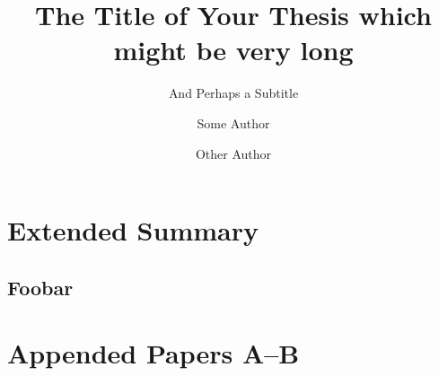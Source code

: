 \documentclass[doctorate,b5paper]{chalmers-thesis}
\title{The Title of Your Thesis which might be very long}
\subtitle{And Perhaps a Subtitle}
\author{Some Author\and Other Author}
\begin{document}
\maketitle

\part{Extended Summary} %


\blindtext
\chapter{Foobar}
\blindtext
\nocite{*} %
\printbibliography

\part{Appended Papers A--B}

%

%
\end{document}
